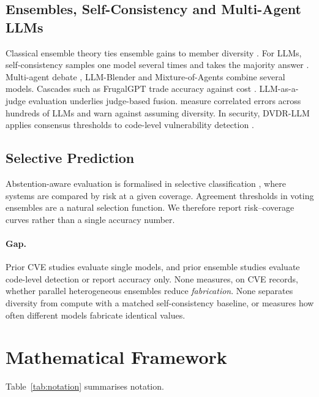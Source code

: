 \documentclass[11pt]{article}
\begin{document}
\subsection{Ensembles, Self-Consistency and Multi-Agent LLMs}
Classical ensemble theory ties ensemble gains to member diversity \citep{dietterich2000,kuncheva2003}. For LLMs, self-consistency samples one model several times and takes the majority answer \citep{wang2023selfconsistency}. Multi-agent debate \citep{du2024debate}, LLM-Blender \citep{jiang2023blender} and Mixture-of-Agents \citep{wang2024moa} combine several models. Cascades such as FrugalGPT trade accuracy against cost \citep{chen2023frugalgpt}. LLM-as-a-judge evaluation \citep{zheng2023judge} underlies judge-based fusion. \citet{kim2025correlated} measure correlated errors across hundreds of LLMs and warn against assuming diversity. In security, DVDR-LLM applies consensus thresholds to code-level vulnerability detection \citep{zibaeirad2025diverse}.

\subsection{Selective Prediction}
Abstention-aware evaluation is formalised in selective classification \citep{elyaniv2010selective,geifman2017selective}, where systems are compared by risk at a given coverage. Agreement thresholds in voting ensembles are a natural selection function. We therefore report risk--coverage curves rather than a single accuracy number.

\paragraph{Gap.} Prior CVE studies evaluate single models, and prior ensemble studies evaluate code-level detection or report accuracy only. None measures, on CVE records, whether parallel heterogeneous ensembles reduce \emph{fabrication}. None separates diversity from compute with a matched self-consistency baseline, or measures how often different models fabricate identical values.

\section{Mathematical Framework}\label{sec:math}

Table~\ref{tab:notation} summarises notation.
\end{document}
